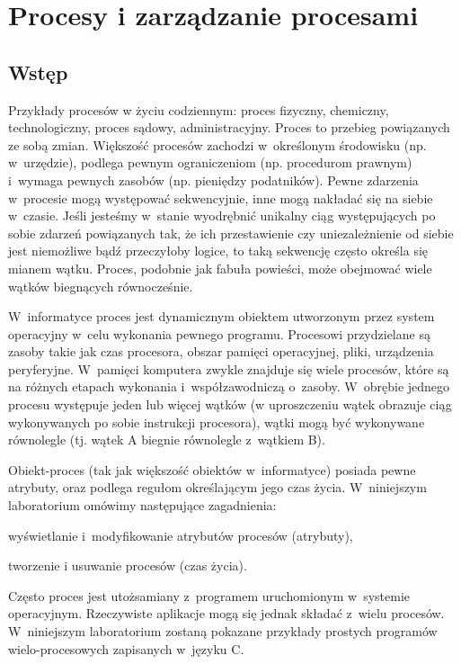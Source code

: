 \section{Procesy i zarządzanie procesami}

\subsection{Wstęp}

Przykłady procesów w życiu codziennym: proces fizyczny, chemiczny,
technologiczny, proces sądowy, administracyjny. Proces to przebieg powiązanych
ze sobą zmian. Większość procesów zachodzi w~określonym środowisku (np.
w~urzędzie), podlega pewnym ograniczeniom (np.  procedurom prawnym) i~wymaga
pewnych zasobów (np.  pieniędzy podatników). Pewne zdarzenia w~procesie
mogą występować sekwencyjnie, inne mogą nakładać się na siebie w~czasie. Jeśli
jesteśmy w~stanie wyodrębnić unikalny ciąg występujących po sobie zdarzeń
powiązanych tak, że ich przestawienie czy uniezależnienie od siebie jest
niemożliwe bądź przeczyłoby logice, to taką sekwencję często określa się mianem
wątku. Proces, podobnie jak fabuła powieści, może obejmować wiele wątków
biegnących równocześnie.

W~informatyce proces jest dynamicznym obiektem utworzonym przez system
operacyjny w~celu wykonania pewnego programu. Procesowi przydzielane są zasoby
takie jak czas procesora, obszar pamięci operacyjnej, pliki, urządzenia
peryferyjne. W~pamięci komputera zwykle znajduje się wiele procesów, które są
na różnych etapach wykonania i~współzawodniczą o~zasoby. W~obrębie jednego
procesu występuje jeden lub więcej wątków (w uproszczeniu wątek obrazuje ciąg
wykonywanych po sobie instrukcji procesora), wątki mogą być wykonywane
równolegle (tj. wątek A biegnie równolegle z~wątkiem B).

Obiekt-proces (tak jak większość obiektów w~informatyce) posiada pewne atrybuty,
oraz podlega regułom określającym jego czas życia. W~niniejszym laboratorium
omówimy następujące zagadnienia:
\begin{myitemize}
  \item wyświetlanie i~modyfikowanie atrybutów procesów (atrybuty),
  \item tworzenie i usuwanie procesów (czas życia).
\end{myitemize}

Często proces jest utożsamiany z~programem uruchomionym w~systemie operacyjnym.
Rzeczywiste aplikacje mogą się jednak składać z~wielu procesów. W~niniejszym
laboratorium zostaną pokazane przykłady prostych programów wielo-procesowych
zapisanych w~języku C.

